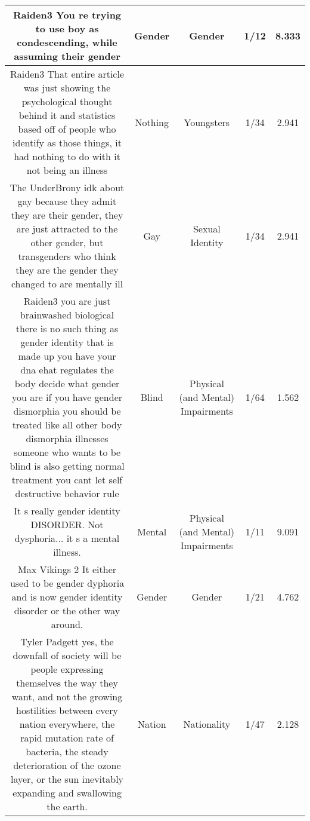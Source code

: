 \documentclass[11pt]{article}
\newlength\mylength
\begin{document}
\begin{center}
\begin{longtable}{|C{.40\mylength}|C{.30\mylength}|C{.15\mylength}|C{.15\mylength}|C{.15\mylength}|}
  Raiden3 You re trying to use  boy  as condescending, while assuming their gender  & Gender & Gender & 1/12 & 8.333 \\  \hline
  Raiden3 That entire article was just showing the psychological thought behind it and statistics based off of people who identify as those things, it had nothing to do with it not being an illness  & Nothing & Youngsters & 1/34 & 2.941 \\  \hline
  The UnderBrony idk about gay because they admit they are their gender, they are just attracted to the other gender, but transgenders who think they are the gender they changed to are mentally ill  & Gay & Sexual Identity & 1/34 & 2.941 \\  \hline
  Raiden3 you are just brainwashed biological there is no such thing as gender identity that is made up you have your dna ehat regulates the body decide what gender you are if you have gender dismorphia you should be treated like all other body dismorphia illnesses someone who wants to be blind is also getting normal treatment you cant let self destructive behavior rule  & Blind & Physical (and Mental) Impairments & 1/64 & 1.562 \\  \hline
  It s really gender identity DISORDER. Not dysphoria... it s a mental illness.  & Mental & Physical (and Mental) Impairments & 1/11 & 9.091 \\  \hline
  Max Vikings 2 It either used to be gender dyphoria and is now gender identity disorder or the other way around.  & Gender & Gender & 1/21 & 4.762 \\  \hline
  Tyler Padgett yes, the downfall of society will be people expressing themselves the way they want, and not the growing hostilities between every nation everywhere, the rapid mutation rate of bacteria, the steady deterioration of the ozone layer, or the sun inevitably expanding and swallowing the earth.  & Nation & Nationality & 1/47 & 2.128 \\  \hline

\end{longtable}
\end{center}
\end{document}
